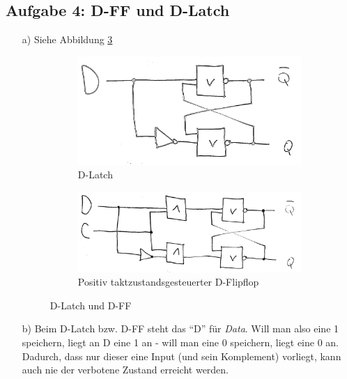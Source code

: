 \documentclass{article}
\begin{document}
	\subsection*{Aufgabe 4: D-FF und D-Latch}
	\begin{enumerate}
		\item[a)] Siehe Abbildung \ref{f:dlff}
		\begin{figure}[h]
			\centering
			\begin{subfigure}[b]{0.45\linewidth}
				\centering
				\includegraphics[width=.8\linewidth]{dlatch.jpeg}
				\caption{D-Latch}
				\label{f:dlatch}
			\end{subfigure}
			\begin{subfigure}[b]{0.45\linewidth}
				\centering
				\includegraphics[width=\linewidth]{dff.jpeg}
				\caption{Positiv taktzustandsgesteuerter D-Flipflop}
				\label{f:dff}
			\end{subfigure}
			\caption{D-Latch und D-FF}
			\label{f:dlff}
		\end{figure}
		\item[b)] Beim D-Latch bzw. D-FF steht das "`D"' für \textit{Data}. Will man also eine 1 speichern, liegt an D eine 1 an - will man eine 0 speichern, liegt eine 0 an. Dadurch, dass nur dieser eine Input (und sein Komplement) vorliegt, kann auch nie der verbotene Zustand erreicht werden. 


\end{enumerate}
\end{document}
